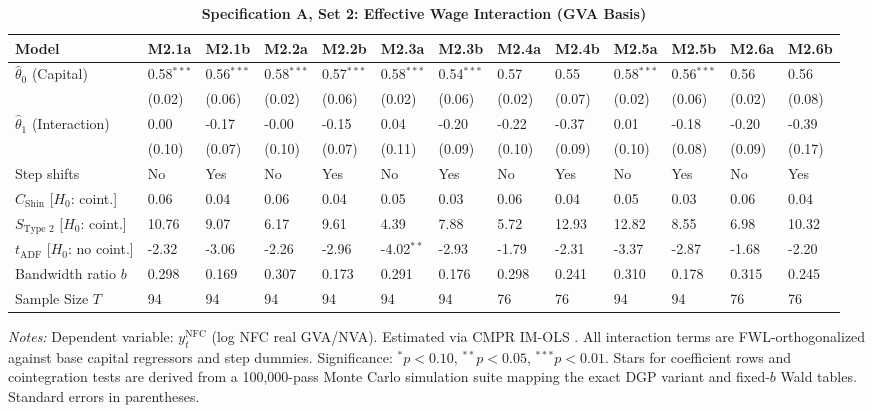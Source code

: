 \FloatBarrier
\begin{table}[h!]
	\centering
	\caption{\textbf{Specification A, Set 2: Effective Wage Interaction (GVA Basis)}}
	\label{tab:specA_set2_gva_app}
	\tiny
	\setlength{\tabcolsep}{1.5pt}
	\begin{tabular}{p{3.2cm}p{1.0cm}p{1.0cm}p{1.0cm}p{1.0cm}p{1.0cm}p{1.0cm}p{1.0cm}p{1.0cm}p{1.0cm}p{1.0cm}p{1.0cm}p{1.0cm}}
		\toprule
		Model & M2.1a & M2.1b & M2.2a & M2.2b & M2.3a & M2.3b & M2.4a & M2.4b & M2.5a & M2.5b & M2.6a & M2.6b \\
		\midrule
		$\hat{\theta}_0$ (Capital) & 0.58$^{***}$ & 0.56$^{***}$ & 0.58$^{***}$ & 0.57$^{***}$ & 0.58$^{***}$ & 0.54$^{***}$ & 0.57 & 0.55 & 0.58$^{***}$ & 0.56$^{***}$ & 0.56 & 0.56 \\
		& (0.02) & (0.06) & (0.02) & (0.06) & (0.02) & (0.06) & (0.02) & (0.07) & (0.02) & (0.06) & (0.02) & (0.08) \\
		$\hat{\theta}_1$ (Interaction) & 0.00 & -0.17 & -0.00 & -0.15 & 0.04 & -0.20 & -0.22 & -0.37 & 0.01 & -0.18 & -0.20 & -0.39 \\
		& (0.10) & (0.07) & (0.10) & (0.07) & (0.11) & (0.09) & (0.10) & (0.09) & (0.10) & (0.08) & (0.09) & (0.17) \\
		\midrule
		Step shifts & No & Yes & No & Yes & No & Yes & No & Yes & No & Yes & No & Yes \\
		$C_{\text{Shin}}$ [$H_0$: coint.] & 0.06 & 0.04 & 0.06 & 0.04 & 0.05 & 0.03 & 0.06 & 0.04 & 0.05 & 0.03 & 0.06 & 0.04 \\
		$S_{\text{Type 2}}$ [$H_0$: coint.] & 10.76 & 9.07 & 6.17 & 9.61 & 4.39 & 7.88 & 5.72 & 12.93 & 12.82 & 8.55 & 6.98 & 10.32 \\
		$t_{\text{ADF}}$ [$H_0$: no coint.] & -2.32 & -3.06 & -2.26 & -2.96 & -4.02$^{**}$ & -2.93 & -1.79 & -2.31 & -3.37 & -2.87 & -1.68 & -2.20 \\
		Bandwidth ratio $b$ & 0.298 & 0.169 & 0.307 & 0.173 & 0.291 & 0.176 & 0.298 & 0.241 & 0.310 & 0.178 & 0.315 & 0.245 \\
		Sample Size $T$ & 94 & 94 & 94 & 94 & 94 & 94 & 76 & 76 & 94 & 94 & 76 & 76 \\
		\bottomrule
	\end{tabular}
	\begin{minipage}{\textwidth}
		\scriptsize
		\textit{Notes:} Dependent variable: $y_t^{\text{NFC}}$ (log NFC real GVA/NVA). Estimated via CMPR IM-OLS \citep{VogelsangWagner2014}. All interaction terms are FWL-orthogonalized against base capital regressors and step dummies. Significance: $^*p<0.10$, $^{**}p<0.05$, $^{***}p<0.01$. Stars for coefficient rows and cointegration tests are derived from a 100,000-pass Monte Carlo simulation suite mapping the exact DGP variant and fixed-$b$ Wald tables. Standard errors in parentheses.
	\end{minipage}
\end{table}

